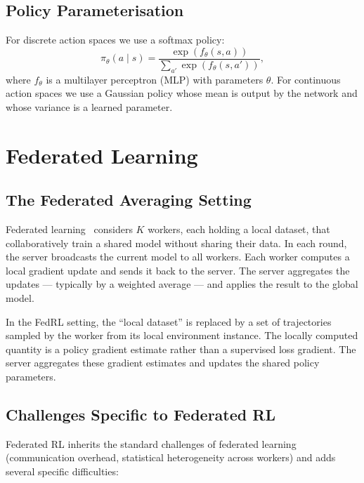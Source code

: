 \subsection{Policy Parameterisation}

For discrete action spaces we use a softmax policy:
\[
    \pi_\theta(a \mid s) = \frac{\exp(f_\theta(s, a))}
    {\sum_{a'} \exp(f_\theta(s, a'))},
\]
where $f_\theta$ is a multilayer perceptron (MLP) with parameters $\theta$.
For continuous action spaces we use a Gaussian policy whose mean is output by
the network and whose variance is a learned parameter.

\section{Federated Learning}

\subsection{The Federated Averaging Setting}

Federated learning~\cite{mcmahan2017fedavg} considers $K$ workers, each holding
a local dataset, that collaboratively train a shared model without sharing their
data. In each round, the server broadcasts the current model to all workers.
Each worker computes a local gradient update and sends it back to the server.
The server aggregates the updates --- typically by a weighted average --- and
applies the result to the global model.

In the FedRL setting, the ``local dataset'' is replaced by a set of trajectories
sampled by the worker from its local environment instance. The locally computed
quantity is a policy gradient estimate rather than a supervised loss gradient.
The server aggregates these gradient estimates and updates the shared policy
parameters.

\subsection{Challenges Specific to Federated RL}

Federated RL inherits the standard challenges of federated learning (communication
overhead, statistical heterogeneity across workers) and adds several specific
difficulties:

